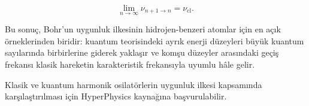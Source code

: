 \documentclass[00_kitap.tex]{subfiles}
\begin{document}
\begin{equation}
	\lim_{n\rightarrow\infty}
	\nu_{n+1\rightarrow n}
	=
	\nu_{\mathrm{cl}}.
\end{equation}

Bu sonuç, Bohr'un uygunluk ilkesinin hidrojen-benzeri atomlar için en açık
örneklerinden biridir: kuantum teorisindeki ayrık enerji düzeyleri büyük
kuantum sayılarında birbirlerine giderek yaklaşır ve komşu düzeyler arasındaki
geçiş frekansı klasik hareketin karakteristik frekansıyla uyumlu hâle gelir.

Klasik ve kuantum harmonik osilatörlerin uygunluk ilkesi kapsamında
karşılaştırılması için HyperPhysics kaynağına
\cite{web:hyperphysics_correspondence_principle} başvurulabilir.



\BolumKaynakcaBitir
\end{document}
